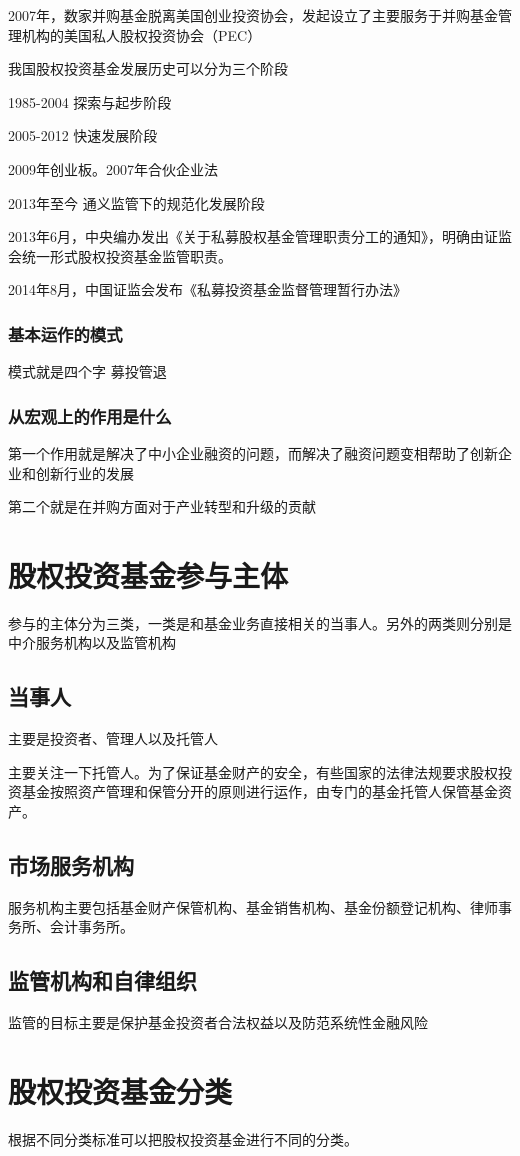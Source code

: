 \documentclass[UTF8,12pt]{ctexbook}
\numberwithin{equation}{section} %
\numberwithin{figure}{section}
\numberwithin{table}{section}
\begin{document}
	2007年，数家并购基金脱离美国创业投资协会，发起设立了主要服务于并购基金管理机构的美国私人股权投资协会（PEC）
	
	我国股权投资基金发展历史可以分为三个阶段
	
	1985-2004 探索与起步阶段
	
	
	2005-2012 快速发展阶段
	
	2009年创业板。2007年合伙企业法
	
	2013年至今 通义监管下的规范化发展阶段
	
	2013年6月，中央编办发出《关于私募股权基金管理职责分工的通知》，明确由证监会统一形式股权投资基金监管职责。
	
	2014年8月，中国证监会发布《私募投资基金监督管理暂行办法》
	
	
	
	\subsubsection{基本运作的模式}
	模式就是四个字 募投管退
	
	\subsubsection{从宏观上的作用是什么}
	第一个作用就是解决了中小企业融资的问题，而解决了融资问题变相帮助了创新企业和创新行业的发展
	
	第二个就是在并购方面对于产业转型和升级的贡献
	
	\section{股权投资基金参与主体}
	参与的主体分为三类，一类是和基金业务直接相关的当事人。另外的两类则分别是中介服务机构以及监管机构
	
	\subsection{当事人}
	主要是投资者、管理人以及托管人
	
	主要关注一下托管人。为了保证基金财产的安全，有些国家的法律法规要求股权投资基金按照资产管理和保管分开的原则进行运作，由专门的基金托管人保管基金资产。
	
	
	\subsection{市场服务机构}
	服务机构主要包括基金财产保管机构、基金销售机构、基金份额登记机构、律师事务所、会计事务所。
	
	\subsection{监管机构和自律组织}
	
	监管的目标主要是保护基金投资者合法权益以及防范系统性金融风险
	
	\section{股权投资基金分类}
	根据不同分类标准可以把股权投资基金进行不同的分类。
	
	
	
	
\end{document}

